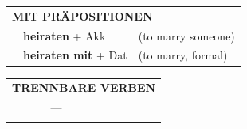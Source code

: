\documentclass[10pt,a4paper]{revtex4-2}
\begin{document}
\begin{verbbox}
\vspace{10pt}

\begin{tabular}{lll}
\multicolumn{3}{l}{\textbf{MIT PRÄPOSITIONEN}}\\
& \textbf{heiraten} + Akk & (to marry someone)\\
& \textbf{heiraten mit} + Dat & (to marry, formal)\\
\end{tabular}
\hfill
\begin{tabular}{lll}
\multicolumn{3}{l}{\textbf{TRENNBARE VERBEN}}\\
& ---\\
\vspace{10pt}
\end{tabular}

\vspace{-5pt}
\end{verbbox}
\end{document}
